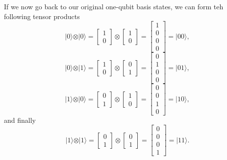 If we now go back to our original one-qubit basis states, we can form teh following tensor products
\[
\vert 0 \rangle \otimes \vert 0 \rangle = \begin{bmatrix} 1 \\ 0\end{bmatrix} \otimes \begin{bmatrix} 1 \\ 0\end{bmatrix} =\begin{bmatrix} 1 \\ 0 \\ 0 \\ 0 \end{bmatrix}=\vert 00 \rangle, 
\]
\[
\vert 0 \rangle \otimes \vert 1 \rangle = \begin{bmatrix} 1 \\ 0\end{bmatrix} \otimes \begin{bmatrix} 0 \\ 1\end{bmatrix} =\begin{bmatrix} 0 \\ 1 \\ 0 \\ 0 \end{bmatrix}=\vert 01 \rangle, 
\]
\[
\vert 1 \rangle \otimes \vert 0 \rangle = \begin{bmatrix} 0 \\ 1\end{bmatrix} \otimes \begin{bmatrix} 1 \\ 0\end{bmatrix} =\begin{bmatrix} 0 \\ 0 \\ 1 \\ 0 \end{bmatrix}=\vert 10 \rangle, 
\]
and finally
\[
\vert 1 \rangle \otimes \vert 1 \rangle = \begin{bmatrix} 0 \\ 1\end{bmatrix} \otimes \begin{bmatrix} 0 \\ 1\end{bmatrix} =\begin{bmatrix} 0 \\ 0 \\ 0 \\ 1 \end{bmatrix}=\vert 11 \rangle. 
\]

